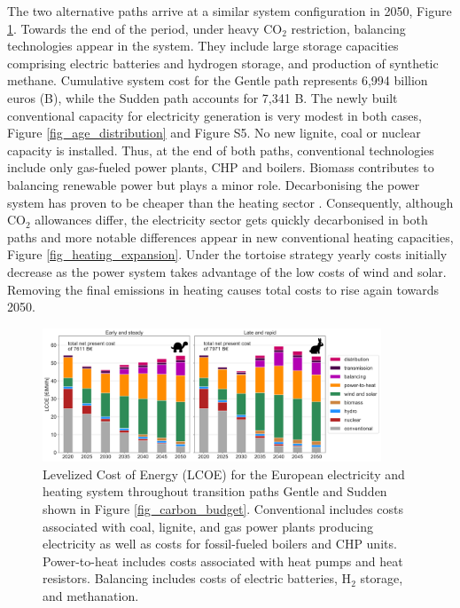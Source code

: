 \documentclass[5p]{elsarticle} %
\begin{document}
The two alternative paths arrive at a similar system configuration in 2050, Figure \ref{fig_system_cost}. Towards the end of the period, under heavy CO$_2$ restriction, balancing technologies appear in the system. They include large storage capacities comprising electric batteries and hydrogen storage, and production of synthetic methane.  Cumulative system cost for the Gentle path represents 6,994 billion euros (B\EUR), while the Sudden path accounts for 7,341 B\EUR. The newly built conventional capacity for electricity generation is very modest in both cases, Figure \ref{fig_age_distribution} and Figure S5. No new lignite, coal or nuclear capacity is installed. Thus, at the end of both paths, conventional technologies include only gas-fueled power plants, CHP and boilers. Biomass contributes to balancing renewable power but plays a minor role. Decarbonising the power system has proven to be cheaper than the heating sector \cite{Zhu_2019}. Consequently, although CO$_2$ allowances differ, the electricity sector gets quickly decarbonised in both paths and more notable differences appear in new conventional heating capacities, Figure \ref{fig_heating_expansion}. Under the tortoise strategy yearly costs initially decrease as the power system takes advantage of the low costs of wind and solar. Removing the final emissions in heating causes total costs to rise again towards 2050.

\begin{figure}[!h]
\centering
\includegraphics[width=0.9\textwidth]{../figures/LCOE_Base.png}
\caption{Levelized Cost of Energy (LCOE) for the European electricity and heating system throughout transition paths Gentle and Sudden shown in Figure \ref{fig_carbon_budget}. Conventional includes costs associated with coal, lignite, and gas power plants producing electricity as well as costs for fossil-fueled boilers and CHP units. Power-to-heat includes costs associated with heat pumps and heat resistors. Balancing includes costs of electric batteries, H$_2$ storage, and methanation. } \label{fig_system_cost} 
\end{figure}
\end{document}
